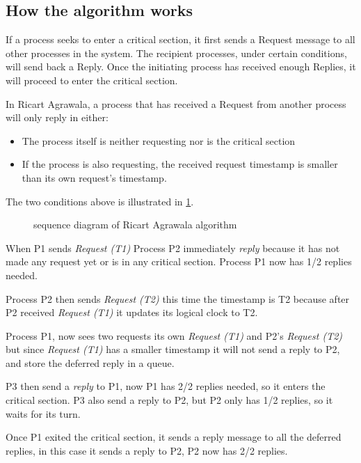 \subsection{How the algorithm works}

If a process seeks to enter a critical section, it first sends a Request message to all other processes in the system. The recipient processes, under certain conditions, will send back a Reply. Once the initiating process has received enough Replies, it will proceed to enter the critical section.

In Ricart Agrawala, a process that has received a Request from another process will only 
reply in either:

\begin{itemize}
  \item The process itself is neither requesting nor is the critical section
  \item If the process is also requesting, the received request timestamp is smaller than its own request's timestamp.
\end{itemize}

The two conditions above is illustrated in \ref{fig:ricart_agrawala_seq}.

\begin{figure}[htbp]
  \centering
  
  \caption{sequence diagram of Ricart Agrawala algorithm}
  \label{fig:ricart_agrawala_seq}
\end{figure}

When P1 sends \textit{Request (T1)} Process P2 immediately \textit{reply} because it has not made any request yet 
or is in any critical section. Process P1 now has 1/2 replies needed.

Process P2 then sends \textit{Request (T2)} this time the timestamp is T2 because after P2 received 
\textit{Request (T1)} it updates its logical clock to T2. 

Process P1, now sees two requests its own \textit{Request (T1)} and P2's \textit{Request (T2)}
but since \textit{Request (T1)} has a smaller timestamp it will not send a reply to P2, and store
the deferred reply in a queue.

P3 then send a \textit{reply} to P1, now P1 has 2/2 replies needed, so it enters the critical 
section. P3 also send a reply to P2, but P2 only has 1/2 replies, so it waits for its turn.

Once P1 exited the critical section, it sends a reply message to all the deferred replies,
in this case it sends a reply to P2, P2 now has 2/2 replies. 

